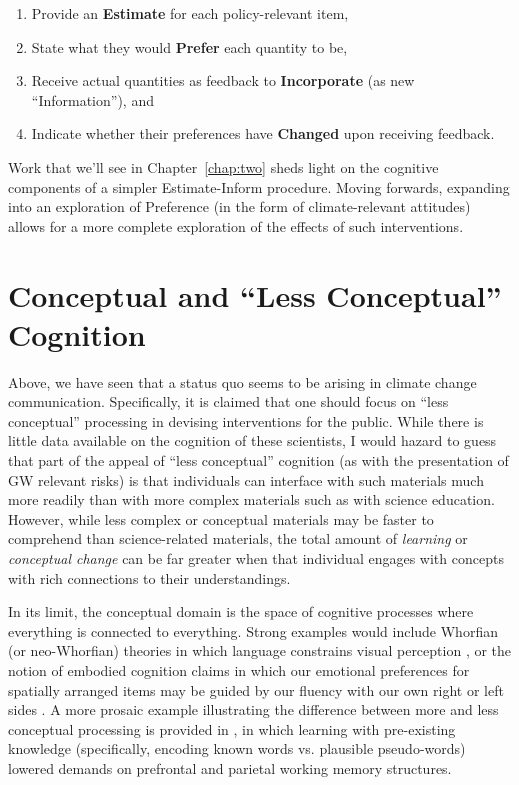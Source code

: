 \begin{enumerate}
\item Provide an \textbf{Estimate} for each policy-relevant item,
\item State what they would \textbf{Prefer} each quantity to be, 
\item Receive actual quantities as feedback to \textbf{Incorporate} (as new
``Information''), and 
\item Indicate whether their preferences have \textbf{Changed} upon receiving feedback.
\end{enumerate}

Work that we'll see in Chapter~\ref{chap:two} sheds light on the cognitive
components of a simpler Estimate-Inform procedure. Moving forwards, expanding
into an exploration of Preference (in the form of climate-relevant attitudes)
allows for a more complete exploration of the effects of such interventions.

\section{Conceptual and \texorpdfstring{``Less Conceptual''}{``Less Conceptual''} Cognition}
\label{sec:two}


Above, we have seen that a status quo seems to be arising in climate change
communication. Specifically, it is claimed that one should focus on ``less
conceptual'' processing in devising interventions for the public. While there is
little data available on the cognition of these scientists, I would hazard to
guess that part of the appeal of ``less conceptual'' cognition (as with the
presentation of GW relevant risks) is that individuals can interface with such
materials much more readily than with more complex materials such as
with science education. However, while less complex or conceptual materials
may be faster to comprehend than science-related materials, the total amount of 
\emph{learning} or \emph{conceptual change} can be far greater when that
individual engages with concepts with rich connections to their understandings.

In its limit, the conceptual domain is the space of cognitive processes where
everything is connected to everything. Strong examples would include Whorfian
(or neo-Whorfian) theories in which language constrains visual perception
\parencite{boroditsky_does_2001}, or the notion of embodied cognition claims in
which our emotional preferences for spatially arranged items may be guided by
our fluency with our own right or left sides
\parencite{casasanto_embodiment_2009}. A more prosaic example illustrating the
difference between more and less conceptual processing is provided in
\textcite{clark_assembling_2003}, in which learning with pre-existing knowledge
(specifically, encoding known words vs. plausible pseudo-words) lowered demands
on prefrontal and parietal working memory structures.

